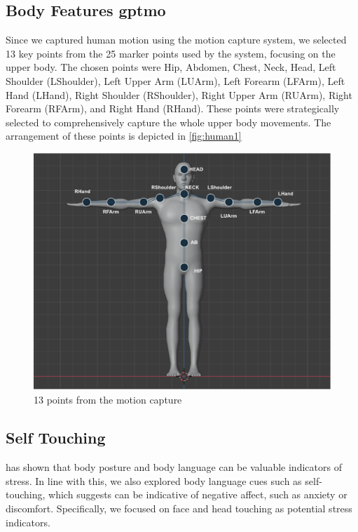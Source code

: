 \subsection{Body Features \gls{gptmo}}
Since we captured human motion using the motion capture system, we selected 13 key points from the 25 marker points used by the system, focusing on the upper body. The chosen points were Hip, Abdomen, Chest, Neck, Head, Left Shoulder (LShoulder), Left Upper Arm (LUArm), Left Forearm (LFArm), Left Hand (LHand), Right Shoulder (RShoulder), Right Upper Arm (RUArm), Right Forearm (RFArm), and Right Hand (RHand). These points were strategically selected to comprehensively capture the whole upper body movements. The arrangement of these points is depicted in \autoref{fig:human1}



\begin{figure}[!htbp]
	\centering
	\includegraphics[width=0.8\columnwidth]{images/humandraw.pdf}
	\caption{13 points from the motion capture} 
	\label{fig:human1}
\end{figure}
\subsection*{Self Touching} 
\textcite{10.1371/journal.pone.0043571} has shown that body posture and body language can be valuable indicators of stress. In line with this, we also explored body language cues such as self-touching, which \textcite{HARRIGAN19851161} suggests can be indicative of negative affect, such as anxiety or discomfort. Specifically, we focused on face and head touching as potential stress indicators.

